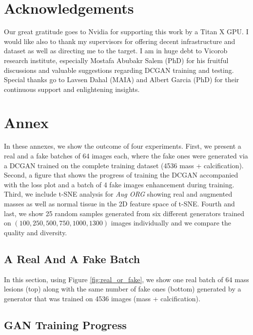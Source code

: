 \documentclass[final,3p,twocolumn,authoryear,sort&compress,times]{maia}
\begin{document}
\section{Acknowledgements}
Our great gratitude goes to Nvidia for supporting this work by a Titan X GPU.
I would like also to thank my supervisors for offering decent infrastructure and dataset as well as directing me to the target. I am in huge debt to Vicorob research institute, especially Mostafa Abubakr Salem (PhD) for his fruitful discussions and valuable suggestions regarding DCGAN training and testing. Special thanks go to Lavsen Dahal (MAIA) and Albert Garcia (PhD) for their continuous support and enlightening insights.



\section{Annex}
In these annexes, we show the outcome of four experiments. First, we present a real and a fake batches of 64 images each, where the fake ones were generated via a DCGAN trained on the complete training dataset (4536 mass + calcification). Second, a figure that shows the progress of training the DCGAN accompanied with the loss plot and a batch of 4 fake images enhancement during training. Third, we include t-SNE analysis for \textit{Aug ORG} showing real and augmented masses as well as normal tissue in the 2D feature space of t-SNE. Fourth and last, we show 25 random samples generated from six different generators trained on $(100, 250, 500, 750, 1000, 1300)$ images individually and we compare the quality and diversity. 

\subsection{A Real And A Fake Batch}
\label{annex:ROF}
In this section, 
using Figure \ref{fig:real_or_fake}, we show one real batch of 64 mass lesions (top) along with the same number of fake ones (bottom) generated by a generator that was trained on 4536 images (mass + calcification).

\subsection{GAN Training Progress}
\label{annex:GAN_progress}
\end{document}
